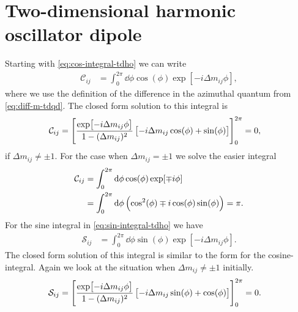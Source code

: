     \section{Two-dimensional harmonic oscillator dipole}
        \label{app:tdho-dipole}
        Starting with \autoref{eq:cos-integral-tdho} we can write
        \begin{align}
            \mathcal{C}_{ij}
            &=
            \int_{0}^{2\pi}
            \dd \phi
            \cos(\phi)
            \exp[-i\Delta m_{ij} \phi],
        \end{align}
        where we use the definition of the difference in the azimuthal quantum
        from \autoref{eq:diff-m-tdqd}.
        The closed form solution to this integral is
        \begin{align}
            \mathcal{C}_{ij}
            &= \left[ 
                \frac{\exp[-i\Delta m_{ij} \phi]}{1 - (\Delta m_{ij})^2}
                \left[ 
                    -i\Delta m_{ij} \cos(\phi)
                    + \sin(\phi)
                 \right]
             \right]_{0}^{2\pi}
            = 0,
            \label{eq:dipole-x-tdqd}
        \end{align}
        if $\Delta m_{ij} \neq \pm 1$.
        For the case when $\Delta m_{ij} = \pm 1$ we solve the easier
        integral
        \begin{align}
            \mathcal{C}_{ij}
            &=
            \int_{0}^{2\pi}
            \dd \phi
            \cos(\phi) \exp[\mp i\phi]
            \\
            &=
            \int_{0}^{2\pi}
            \dd \phi
            \left( 
                \cos^2(\phi)
                \mp i\cos(\phi)\sin(\phi)
             \right)
            = \pi.
        \end{align}
        For the sine integral in \autoref{eq:sin-integral-tdho} we have
        \begin{align}
            \mathcal{S}_{ij}
            &=
            \int_{0}^{2\pi}
            \dd\phi
            \sin(\phi)
            \exp[-i\Delta m_{ij} \phi].
        \end{align}
        The closed form solution of this integral is similar to the form for
        the cosine-integral.
        Again we look at the situation when $\Delta m_{ij} \neq \pm 1$
        initially.
        \begin{align}
            \mathcal{S}_{ij}
            &= \left[ 
                \frac{\exp[-i\Delta m_{ij} \phi]}{1 - (\Delta m_{ij})^2}
                \left[ 
                    -i\Delta m_{ij} \sin(\phi)
                    + \cos(\phi)
                 \right]
             \right]_{0}^{2\pi}
            = 0.
            \label{eq:dipole-y-tdqd}
        \end{align}
